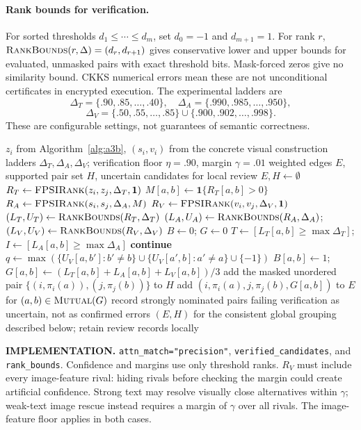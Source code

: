 \documentclass[11pt]{article}
\newcommand{\mutual}{\textsc{Mutual}}
\newcommand{\fprank}{\textsc{FPSIRank}}
\newcommand{\bounds}{\textsc{RankBounds}}
\newcommand{\ind}{\mathbf{1}}
\begin{document}
\paragraph{Rank bounds for verification.}
For sorted thresholds $d_1\le\cdots\le d_m$, set $d_0=-1$ and $d_{m+1}=1$.
For rank $r$, $\bounds(r,\Delta)=(d_r,d_{r+1})$ gives conservative lower
and upper bounds for evaluated, unmasked pairs with exact threshold bits.
Mask-forced zeros give no similarity bound. CKKS numerical errors mean these
are not unconditional certificates in encrypted execution.
The experimental ladders are
\[
 \Delta_T=\{.90,.85,\ldots,.40\},\quad
 \Delta_A=\{.990,.985,\ldots,.950\},
\]
\[
 \Delta_V=\{.50,.55,\ldots,.85\}\cup\{.900,.902,\ldots,.998\}.
\]
These are configurable settings, not guarantees of semantic correctness.

\clearpage
\begin{algorithm}[H]
\caption{Precision-first attention--affinity preprocessing: current \texttt{psi\_attn\_filter}}
\label{alg:precision}
\footnotesize\begin{algorithmic}[1]
\Require $z_i$ from Algorithm~\ref{alg:a3b}, $(s_i,v_i)$ from the concrete visual construction
\Require ladders $\Delta_T,\Delta_A,\Delta_V$; verification floor $\eta=.90$, margin $\gamma=.01$
\Ensure weighted edges $E$, supported pair set $H$, uncertain candidates for local review
\State $E,H\gets\emptyset$
 \State $R_T\gets\fprank(z_i,z_j,\Delta_T,\mathbf{1})$
 \State $M[a,b]\gets\ind\{R_T[a,b]>0\}$
 \State $R_A\gets\fprank(s_i,s_j,\Delta_A,M)$ 
 \State $R_V\gets\fprank(v_i,v_j,\Delta_V,\mathbf{1})$ 
 \State $(L_T,U_T)\gets\bounds(R_T,\Delta_T)$
 \State $(L_A,U_A)\gets\bounds(R_A,\Delta_A)$; $(L_V,U_V)\gets\bounds(R_V,\Delta_V)$
 \State $B\gets0$; $G\gets0$
  \State $T\gets[L_T[a,b]\ge\max\Delta_T]$; $I\gets[L_A[a,b]\ge\max\Delta_A]$
   \State \textbf{continue}
  \EndIf
  \State $q\gets\max(\{U_V[a,b']:b'\ne b\}\cup\{U_V[a',b]:a'\ne a\}\cup\{-1\})$
   \State $B[a,b]\gets1$; $G[a,b]\gets(L_T[a,b]+L_A[a,b]+L_V[a,b])/3$
   \State add the masked unordered pair $\{(i,\pi_i(a)),(j,\pi_j(b))\}$ to $H$
  \EndIf
 \EndFor
 \State add $(i,\pi_i(a),j,\pi_j(b),G[a,b])$ to $E$ for $(a,b)\in\mutual(G)$
 \State record strongly nominated pairs failing verification as uncertain, not as confirmed errors
\EndFor
\State \Return $(E,H)$ for the consistent global grouping described below; retain review records locally
\Statex \hrulefill
\Statex \raggedright\textbf{IMPLEMENTATION.} \texttt{attn\_match="precision"},
\texttt{verified\_candidates}, and \texttt{rank\_bounds}. Confidence and margins
use only threshold ranks. $R_V$ must include every image-feature rival: hiding
rivals before checking the margin could create artificial confidence.
Strong text may resolve visually close alternatives within $\gamma$;
weak-text image rescue instead requires a margin of $\gamma$ over all rivals.
The image-feature floor applies in both cases.


\end{algorithmic}
\end{algorithm}
\end{document}
